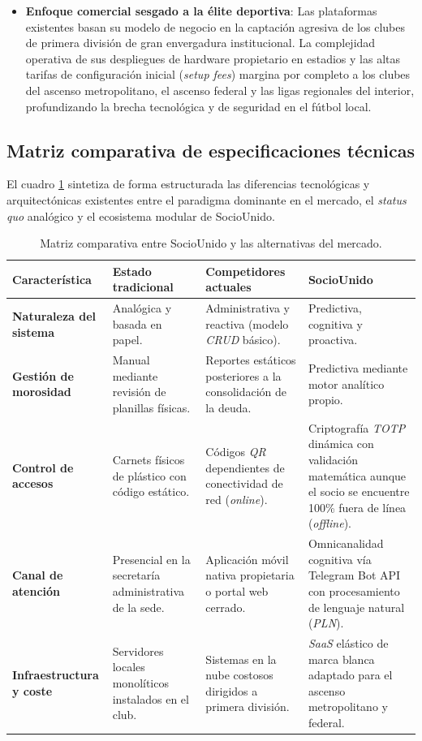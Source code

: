 \begin{itemize}
    \item \textbf{Enfoque comercial sesgado a la élite deportiva}: Las plataformas existentes basan su modelo de negocio en la captación agresiva de los clubes de primera división de gran envergadura institucional. La complejidad operativa de sus despliegues de hardware propietario en estadios y las altas tarifas de configuración inicial (\textit{setup fees}) margina por completo a los clubes del ascenso metropolitano, el ascenso federal y las ligas regionales del interior, profundizando la brecha tecnológica y de seguridad en el fútbol local.
\end{itemize}

\newpage

\subsection{Matriz comparativa de especificaciones técnicas}

El cuadro \ref{tab:matriz_competidores} sintetiza de forma estructurada las diferencias tecnológicas y arquitectónicas existentes entre el paradigma dominante en el mercado, el \textit{status quo} analógico y el ecosistema modular de SocioUnido.

\begin{table}[H]
\centering
\small
\begin{tabularx}{\textwidth}{l >{\raggedright\arraybackslash}X >{\raggedright\arraybackslash}X >{\raggedright\arraybackslash}X}
\toprule
\textbf{Característica} & \textbf{Estado tradicional} & \textbf{Competidores actuales} & \textbf{SocioUnido} \\
\midrule
\textbf{Naturaleza del sistema} & Analógica y basada en papel. & Administrativa y reactiva (modelo \textit{CRUD} básico). & Predictiva, cognitiva y proactiva. \\
\addlinespace
\textbf{Gestión de morosidad} & Manual mediante revisión de planillas físicas. & Reportes estáticos posteriores a la consolidación de la deuda. & Predictiva mediante motor analítico propio. \\
\addlinespace
\textbf{Control de accesos} & Carnets físicos de plástico con código estático. & Códigos \textit{QR} dependientes de conectividad de red (\textit{online}). & Criptografía \textit{TOTP} dinámica con validación matemática aunque el socio se encuentre 100\% fuera de línea (\textit{offline}). \\
\addlinespace
\textbf{Canal de atención} & Presencial en la secretaría administrativa de la sede. & Aplicación móvil nativa propietaria o portal web cerrado. & Omnicanalidad cognitiva vía Telegram Bot API con procesamiento de lenguaje natural (\textit{PLN}). \\
\addlinespace
\textbf{Infraestructura y coste} & Servidores locales monolíticos instalados en el club. & Sistemas en la nube costosos dirigidos a primera división. & \textit{SaaS} elástico de marca blanca adaptado para el ascenso metropolitano y federal. \\
\bottomrule
\end{tabularx}
\caption{Matriz comparativa entre SocioUnido y las alternativas del mercado.}
\label{tab:matriz_competidores}
\end{table}

